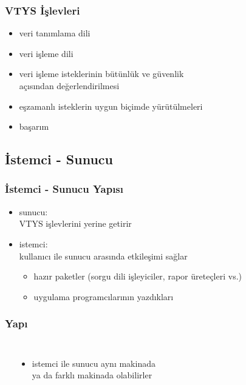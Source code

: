 \documentclass[dvipsnames]{beamer}
\theoremstyle{definition}
\theoremstyle{example}
\theoremstyle{plain}
\begin{document}
\begin{frame}
  \frametitle{VTYS İşlevleri}

  \begin{itemize}
    \item veri tanımlama dili

    \pause
    \item veri işleme dili

    \pause
    \item veri işleme isteklerinin bütünlük ve güvenlik\\
      açısından değerlendirilmesi

    \pause
    \item eşzamanlı isteklerin uygun biçimde yürütülmeleri

    \pause
    \item başarım
  \end{itemize}
\end{frame}

\subsection{İstemci - Sunucu}

\begin{frame}
  \frametitle{İstemci - Sunucu Yapısı}

  \begin{itemize}
    \item \alert{sunucu}:\\
      VTYS işlevlerini yerine getirir

    \pause
    \bigskip
    \item \alert{istemci}:\\
      kullanıcı ile sunucu arasında etkileşimi sağlar
    \begin{itemize}
      \item hazır paketler (sorgu dili işleyiciler, rapor üreteçleri vs.)
      \item uygulama programcılarının yazdıkları
    \end{itemize}
  \end{itemize}
\end{frame}

\begin{frame}
  \frametitle{Yapı}

  \begin{columns}
    \begin{center}
    \end{center}

    \begin{itemize}
      \item istemci ile sunucu aynı makinada\\
        ya da farklı makinada olabilirler
    \end{itemize}
  \end{columns}
\end{frame}
\end{document}
